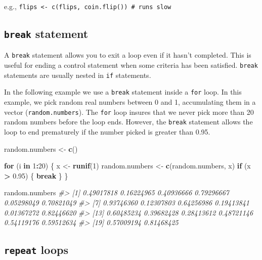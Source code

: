 \documentclass[]{book}
\newenvironment{Shaded}{\begin{snugshade}}{\end{snugshade}}
\newcommand{\CommentTok}[1]{\textcolor[rgb]{0.56,0.35,0.01}{\textit{#1}}}
\newcommand{\ControlFlowTok}[1]{\textcolor[rgb]{0.13,0.29,0.53}{\textbf{#1}}}
\newcommand{\DecValTok}[1]{\textcolor[rgb]{0.00,0.00,0.81}{#1}}
\newcommand{\FloatTok}[1]{\textcolor[rgb]{0.00,0.00,0.81}{#1}}
\newcommand{\KeywordTok}[1]{\textcolor[rgb]{0.13,0.29,0.53}{\textbf{#1}}}
\newcommand{\NormalTok}[1]{#1}
\newcommand{\OperatorTok}[1]{\textcolor[rgb]{0.81,0.36,0.00}{\textbf{#1}}}
\newcommand{\StringTok}[1]{\textcolor[rgb]{0.31,0.60,0.02}{#1}}
\theoremstyle{definition}
\theoremstyle{definition}
\theoremstyle{definition}
\theoremstyle{remark}
\begin{document}
e.g.,
\texttt{flips\ \textless{}-\ c(flips,\ coin.flip())\ \#\ runs\ slow}

\hypertarget{break-statement}{%
\subsection{\texorpdfstring{\texttt{break}
statement}{break statement}}\label{break-statement}}

A \texttt{break} statement allows you to exit a loop even if it hasn't
completed. This is useful for ending a control statement when some
criteria has been satisfied. \texttt{break} statements are usually
nested in \texttt{if} statements.

In the following example we use a \texttt{break} statement inside a
\texttt{for} loop. In this example, we pick random real numbers between
0 and 1, accumulating them in a vector (\texttt{random.numbers}). The
\texttt{for} loop insures that we never pick more than 20 random numbers
before the loop ends. However, the \texttt{break} statement allows the
loop to end prematurely if the number picked is greater than 0.95.

\begin{Shaded}
\begin{Highlighting}[]
\NormalTok{random.numbers <-}\StringTok{ }\KeywordTok{c}\NormalTok{()}

\ControlFlowTok{for}\NormalTok{ (i }\ControlFlowTok{in} \DecValTok{1}\OperatorTok{:}\DecValTok{20}\NormalTok{) \{}
\NormalTok{  x <-}\StringTok{ }\KeywordTok{runif}\NormalTok{(}\DecValTok{1}\NormalTok{)}
\NormalTok{  random.numbers <-}\StringTok{ }\KeywordTok{c}\NormalTok{(random.numbers, x)}
  \ControlFlowTok{if}\NormalTok{ (x }\OperatorTok{>}\StringTok{ }\FloatTok{0.95}\NormalTok{) \{}
    \ControlFlowTok{break}
\NormalTok{  \}}
\NormalTok{\}}

\NormalTok{random.numbers}
\CommentTok{#>  [1] 0.49017818 0.16224965 0.40936666 0.79296667 0.05298049 0.70821049}
\CommentTok{#>  [7] 0.93746360 0.12307803 0.64256986 0.19413841 0.01367272 0.82446620}
\CommentTok{#> [13] 0.60485234 0.39682428 0.28413612 0.48721146 0.54119176 0.59512634}
\CommentTok{#> [19] 0.57009194 0.81468425}
\end{Highlighting}
\end{Shaded}

\hypertarget{repeat-loops}{%
\subsection{\texorpdfstring{\texttt{repeat}
loops}{repeat loops}}\label{repeat-loops}}
\end{document}

